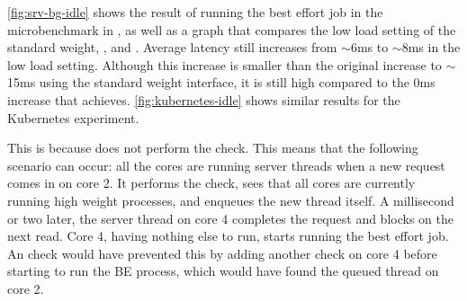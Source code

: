 \autoref{fig:srv-bg-idle} shows the result of running the best effort job in the
microbenchmark in \schedidle{}, as well as a graph that compares the low load
setting of the standard \cgroups{} weight, \schedbe{}, and \schedidle{}. Average
latency still increases from $\sim$6ms to $\sim$8ms in the low load setting.
Although this increase is smaller than the original increase to $\sim$15ms using
the standard weight interface, it is still high compared to the 0ms increase
that \schedbe{} achieves. \autoref{fig:kubernetes-idle} shows similar results
for the Kubernetes experiment.

This is because \schedidle{} does not perform the \exit{} check. This means that
the following scenario can occur: all the cores are running server threads when
a new request comes in on core 2. It performs the \entry{} check, sees that all
cores are currently running high weight processes, and enqueues the new thread
itself. A millisecond or two later, the server thread on core 4 completes the
request and blocks on the next read. Core 4, having nothing else to run, starts
running the best effort job. An \exit{} check would have prevented this by
adding another check on core 4 before starting to run the BE process, which
would have found the queued thread on core 2.